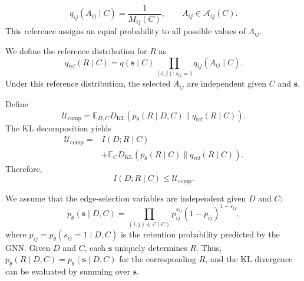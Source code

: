 \begin{equation}
    q_{ij}(A_{ij}\mid C)
    =
    \frac1{M_{ij}(C)},
    \qquad A_{ij}\in\mathcal A_{ij}(C).
    \label{eq:data_reference}
\end{equation}
This reference assigns an equal probability to all possible values of $A_{ij}$.

We define the reference distribution for $R$ as
\begin{equation}
    q_{\mathrm{ref}}(R\mid C)
    =
    q(\mathbf s\mid C)
    \prod_{(i, j):s_{ij}=1}
    q_{ij}(A_{ij}\mid C).
    \label{eq:complete_reference}
\end{equation}
Under this reference distribution, the selected $A_{ij}$ are independent given $C$ and $\mathbf s$.

Define
\[
    \mathcal U_{\mathrm{comp}}
    =
    \mathbb E_{D,C}
    D_{\mathrm{KL}}\!
    \left(
    p_\theta(R\mid D,C)
    \parallel q_{\mathrm{ref}}(R\mid C)
    \right).
\]
The KL decomposition yields
\begin{equation}
    \begin{aligned}
    \mathcal U_{\mathrm{comp}}
    ={}& I(D;R\mid C)\\
    &+\mathbb E_C
    D_{\mathrm{KL}}\!
    \left(
    p_\theta(R\mid C)
    \parallel q_{\mathrm{ref}}(R\mid C)
    \right).
    \end{aligned}
    \label{eq:compression_kl_identity}
\end{equation}
Therefore,
\begin{equation}
    I(D;R\mid C)
    \le \mathcal U_{\mathrm{comp}}.
    \label{eq:variational_bound}
\end{equation}

We assume that the edge-selection variables are independent given $D$ and $C$:
\begin{equation}
    p_\theta(\mathbf s\mid D,C)
    =
    \prod_{(i, j)\in\mathcal E(C)}
    p_{ij}^{s_{ij}}(1-p_{ij})^{1-s_{ij}},
    \label{eq:p_factorized}
\end{equation}
where $p_{ij}=p_\theta(s_{ij}=1\mid D,C)$ is the retention probability predicted by the GNN. Given $D$ and $C$, each $\mathbf s$ uniquely determines $R$. Thus, $p_\theta(R\mid D,C)=p_\theta(\mathbf s\mid D,C)$ for the corresponding $R$, and the KL divergence can be evaluated by summing over $\mathbf s$.

